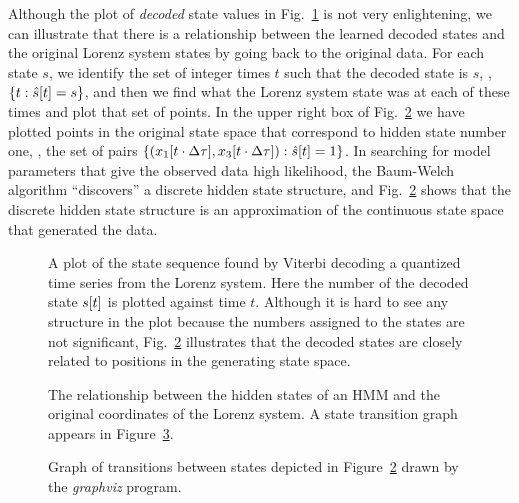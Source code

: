  Although the plot of \emph{decoded} 
 state values in Fig.~\ref{fig:STSintro} is not very enlightening, we
 can illustrate that there is a relationship between the learned
 decoded states and the original Lorenz system states by going back to
 the original data.  For each state $s$, we identify the set of
 integer times $t$ such that the decoded state is $s$, \ie, $\left\{ t
   :{\hat s}{[t]} = s \right\}$, and then we find what the Lorenz
 system state was at each of these times and plot that set of points.
 In the upper right box of Fig.~\ref{fig:Statesintro} we have plotted
 points in the original state space that correspond to hidden state
 number one, \ie, the set of pairs $\left\{
   ({x_1}{[t\cdot\Delta\tau]},{x_3}{[t\cdot\Delta\tau]}) :{\hat
     s}{[t]} = 1 \right\}$.  In searching for model parameters that give
 the observed data high likelihood, the Baum-Welch algorithm
 ``discovers'' a discrete hidden state structure, and
 Fig.~\ref{fig:Statesintro} shows that the discrete hidden state
 structure is an approximation of the continuous state space that
 generated the data.
 \begin{figure}[htbp]
   \caption[A plot of a state sequence found by Viterbi decoding.]%
   {A plot of the state sequence found by Viterbi decoding a quantized
     time series from the Lorenz system.  Here the number of the
     decoded state ${s}{[t]}$ is plotted against time $t$.  Although
     it is hard to see any structure in the plot because the numbers
     assigned to the states are not significant,
     Fig.~\ref{fig:Statesintro} illustrates that the decoded states
     are closely related to positions in the generating state space.}
   \label{fig:STSintro}
 \end{figure}

 \begin{figure}[p]
   \caption[Relationship between states of HMM and Lorenz system.]%
   {The relationship between the hidden states of an HMM and the
     original coordinates of the Lorenz system.  A state transition
     graph appears in Figure~\ref{fig:GraphStates}.}
   \label{fig:Statesintro}
 \end{figure}

 \begin{figure}[p]
   \caption[Graph of transitions between
   states.]%
   {Graph of transitions between states depicted in
     Figure~\ref{fig:Statesintro} drawn by the \emph{graphviz}
     program.}
   \label{fig:GraphStates}
 \end{figure}


